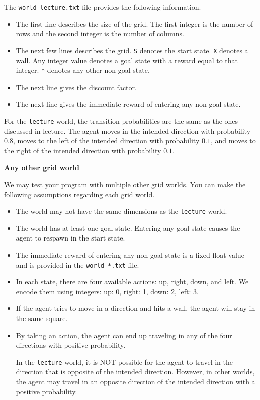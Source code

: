 \documentclass[12pt]{article}
\begin{document}
The \verb+world_lecture.txt+ file provides the following information.
\begin{itemize}
    \item The first line describes the size of the grid. The first integer is the number of rows and the second integer is the number of columns.
    \item The next few lines describes the grid. \verb+S+ denotes the start state. \verb+X+ denotes a wall. Any integer value denotes a goal state with a reward equal to that integer. \verb+*+ denotes any other non-goal state.
    \item The next line gives the discount factor.
    \item The next line gives the immediate reward of entering any non-goal state.
\end{itemize}

For the \verb+lecture+ world, the transition probabilities are the same as the ones discussed in lecture. The agent moves in the intended direction with probability $0.8$, moves to the left of the intended direction with probability $0.1$, and moves to the right of the intended direction with probability $0.1$.

{\bf Any other grid world}

We may test your program with multiple other grid worlds. You can make the following assumptions regarding each grid world. 
\begin{itemize}
\item The world may not have the same dimensions as the \verb+lecture+ world.
\item The world has at least one goal state. Entering any goal state causes the agent to respawn in the start state.
\item The immediate reward of entering any non-goal state is a fixed float value and is provided in the \verb+world_*.txt+ file.
\item In each state, there are four available actions: up, right, down, and left. We encode them using integers: up: 0, right: 1, down: 2, left: 3. 
\item If the agent tries to move in a direction and hits a wall, the agent will stay in the same square.
\item 
By taking an action, the agent can end up traveling in any of the four directions with positive probability. 

In the \verb+lecture+ world, it is NOT possible for the agent to travel in the direction that is opposite of the intended direction. However, in other worlds, the agent may travel in an opposite direction of the intended direction with a positive probability. 
\end{itemize}
\end{document}
